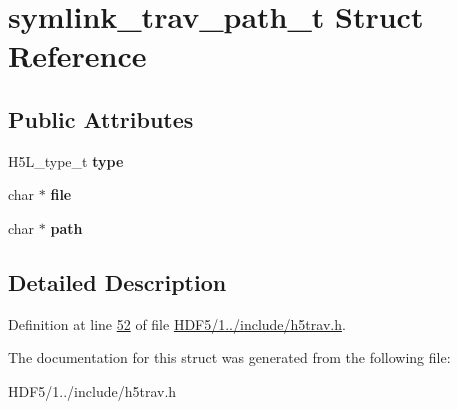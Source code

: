 \hypertarget{structsymlink__trav__path__t}{}\section{symlink\+\_\+trav\+\_\+path\+\_\+t Struct Reference}
\label{structsymlink__trav__path__t}
\subsection*{Public Attributes}
\begin{DoxyCompactItemize}
\item 
\mbox{\label{structsymlink__trav__path__t_a93acca9663437119bfb14eece6b1bbf9}} 
H5\+L\+\_\+type\+\_\+t {\bfseries type}
\item 
\mbox{\label{structsymlink__trav__path__t_abf42fcdb4533b6490fe835449d8bc0dc}} 
char $\ast$ {\bfseries file}
\item 
\mbox{\label{structsymlink__trav__path__t_adc509897a8dad8b9a177309eaaecf068}} 
char $\ast$ {\bfseries path}
\end{DoxyCompactItemize}


\subsection{Detailed Description}


Definition at line \hyperlink{_h_d_f5_21_810_81_2include_2h5trav_8h_source_l00052}{52} of file \hyperlink{_h_d_f5_21_810_81_2include_2h5trav_8h_source}{H\+D\+F5/1../include/h5trav.\+h}.



The documentation for this struct was generated from the following file\+:\begin{DoxyCompactItemize}
\item 
H\+D\+F5/1../include/h5trav.\+h\end{DoxyCompactItemize}
